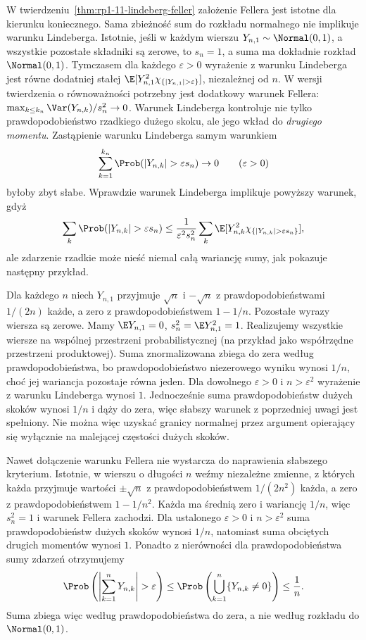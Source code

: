 \begin{uwaga}
W twierdzeniu~\ref{thm:rp1-11-lindeberg-feller}
założenie Fellera jest istotne dla kierunku koniecznego.
Sama zbieżność sum do rozkładu normalnego nie implikuje
warunku Lindeberga. Istotnie, jeśli w każdym wierszu
$Y_{n,1}\sim\Normal(0,1)$, a wszystkie pozostałe
składniki są zerowe, to $s_n=1$, a suma ma dokładnie
rozkład $\Normal(0,1)$. Tymczasem dla każdego
$\varepsilon>0$ wyrażenie z warunku Lindeberga
jest równe dodatniej stałej
$\E[Y_{n,1}^2\chi_{\{|Y_{n,1}|>\varepsilon\}}]$,
niezależnej od $n$. W wersji twierdzenia o równoważności
potrzebny jest dodatkowy warunek Fellera:
$\max_{k\leq k_n}\Var(Y_{n,k})/s_n^2\to0$.
Warunek Lindeberga kontroluje nie tylko prawdopodobieństwo
rzadkiego dużego skoku, ale jego wkład do \emph{drugiego momentu}.
Zastąpienie warunku Lindeberga samym warunkiem
\[
\sum_{k=1}^{k_n}\Prob(|Y_{n,k}|>\varepsilon s_n)\to0
\qquad(\varepsilon>0)
\]
byłoby zbyt słabe. Wprawdzie warunek Lindeberga
implikuje powyższy warunek, gdyż
\[
\sum_k\Prob(|Y_{n,k}|>\varepsilon s_n)
\leq \frac1{\varepsilon^2 s_n^2}
\sum_k\E[Y_{n,k}^2\chi_{\{|Y_{n,k}|>\varepsilon s_n\}}],
\]
ale zdarzenie rzadkie może nieść niemal całą
wariancję sumy, jak pokazuje następny przykład.
\end{uwaga}

\begin{przyklad}
Dla każdego $n$ niech $Y_{n,1}$ przyjmuje $\sqrt n$
i $-\sqrt n$ z prawdopodobieństwami $1/(2n)$
każde, a zero z prawdopodobieństwem $1-1/n$.
Pozostałe wyrazy wiersza są zerowe. Mamy
$\E Y_{n,1}=0$, $s_n^2=\E Y_{n,1}^2=1$.
Realizujemy wszystkie wiersze na wspólnej przestrzeni
probabilistycznej (na przykład jako współrzędne przestrzeni
produktowej). Suma znormalizowana zbiega do zera według prawdopodobieństwa,
bo prawdopodobieństwo niezerowego wyniku wynosi $1/n$,
choć jej wariancja pozostaje równa jeden.
Dla dowolnego $\varepsilon>0$ i $n>\varepsilon^2$
wyrażenie z warunku Lindeberga wynosi $1$.
Jednocześnie suma prawdopodobieństw dużych skoków
wynosi $1/n$ i dąży do zera, więc słabszy warunek
z poprzedniej uwagi jest spełniony.
Nie można więc uzyskać granicy normalnej przez
argument opierający się wyłącznie na malejącej
częstości dużych skoków.

Nawet dołączenie warunku Fellera nie wystarcza do
naprawienia słabszego kryterium. Istotnie, w wierszu
o długości $n$ weźmy niezależne zmienne, z których
każda przyjmuje wartości $\pm\sqrt n$ z prawdopodobieństwem
$1/(2n^2)$ każda, a zero z prawdopodobieństwem $1-1/n^2$.
Każda ma średnią zero i wariancję $1/n$, więc
$s_n^2=1$ i warunek Fellera zachodzi. Dla ustalonego
$\varepsilon>0$ i $n>\varepsilon^2$ suma
prawdopodobieństw dużych skoków wynosi $1/n$,
natomiast suma obciętych drugich momentów wynosi $1$.
Ponadto z nierówności dla prawdopodobieństwa sumy
zdarzeń otrzymujemy
\[
\Prob\left(\left|\sum_{k=1}^n Y_{n,k}\right|>\varepsilon\right)
\leq\Prob\left(\bigcup_{k=1}^n\{Y_{n,k}\ne0\}\right)
\leq\frac1n.
\]
Suma zbiega więc według prawdopodobieństwa do zera,
a nie według rozkładu do $\Normal(0,1)$.
\end{przyklad}

